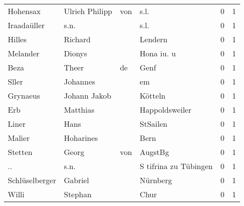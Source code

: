 \begin{center}
\begin{tiny}
\begin{longtabu}{llllrr}
                 Hohensax &                     Ulrieh Philipp &         von &                                        s.l. &          0 &         1 \\
              Iraadaüller &                               s.n. &             &                                        s.l. &          0 &         1 \\
                   Hilles &                            Richard &             &                                     Lendern &          0 &         1 \\
                 Melander &                             Dionys &             &                                  Hona iu. u &          0 &         1 \\
                     Beza &                              Theer &          de &                                        Genf &          0 &         1 \\
                    Sller &                           Johannes &             &                                          em &          0 &         1 \\
                 Grynaeus &                       Johann Jakob &             &                                     Kötteln &          0 &         1 \\
                      Erb &                           Matthias &             &                              Happoldsweiler &          0 &         1 \\
                    Liner &                               Hans &             &                                    StSailen &          0 &         1 \\
                   Malier &                          Hoharines &             &                                        Bern &          0 &         1 \\
                  Stetten &                              Georg &         von &                                     AugstBg &          0 &         1 \\
                       .. &                               s.n. &             &                       S tifrina zu Tübingen &          0 &         1 \\
           Schlüselberger &                            Gabriel &             &                                    Nürnberg &          0 &         1 \\
                    Willi &                            Stephan &             &                                        Chur &          0 &         1 \\

\end{longtabu}
\end{tiny}
\end{center}
